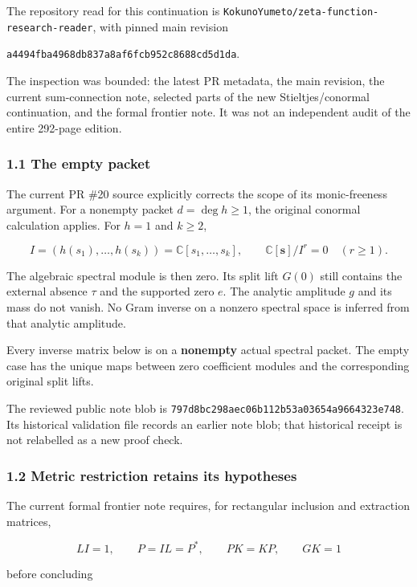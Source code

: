 The repository read for this continuation is
\nolinkurl{KokunoYumeto/zeta-function-research-reader}, with pinned main
revision

\nolinkurl{a4494fba4968db837a8af6fcb952c8688cd5d1da}.

The inspection was bounded: the latest PR metadata, the main revision,
the current sum-connection note, selected parts of the new
Stieltjes/conormal continuation, and the formal frontier note. It was
not an independent audit of the entire 292-page edition.

\subsubsection{1.1 The empty packet}\label{exterior_trace:the-empty-packet}

The current PR \#20 source explicitly corrects the scope of its
monic-freeness argument. For a nonempty packet \(d=\deg h\geq1\), the
original conormal calculation applies. For \(h=1\) and \(k\geq2\),

\[
I=(h(s_1),\ldots,h(s_k))=\mathbb C[s_1,\ldots,s_k],
\qquad
\mathbb C[\mathbf s]/I^r=0\quad(r\geq1).
\]

The algebraic spectral module is then zero. Its split lift \(G(0)\)
still contains the external absence \(\tau\) and the supported zero
\(e\). The analytic amplitude \(g\) and its mass do not vanish. No Gram
inverse on a nonzero spectral space is inferred from that analytic
amplitude.

Every inverse matrix below is on a \textbf{nonempty} actual spectral
packet. The empty case has the unique maps between zero coefficient
modules and the corresponding original split lifts.

The reviewed public note blob is
\nolinkurl{797d8bc298aec06b112b53a03654a9664323e748}. Its historical
validation file records an earlier note blob; that historical receipt is
not relabelled as a new proof check.

\subsubsection{1.2 Metric restriction retains its
hypotheses}\label{exterior_trace:metric-restriction-retains-its-hypotheses}

The current formal frontier note requires, for rectangular inclusion and
extraction matrices,

\[
LI=1,\qquad P=IL=P^*,\qquad PK=KP,\qquad GK=1
\]

before concluding


